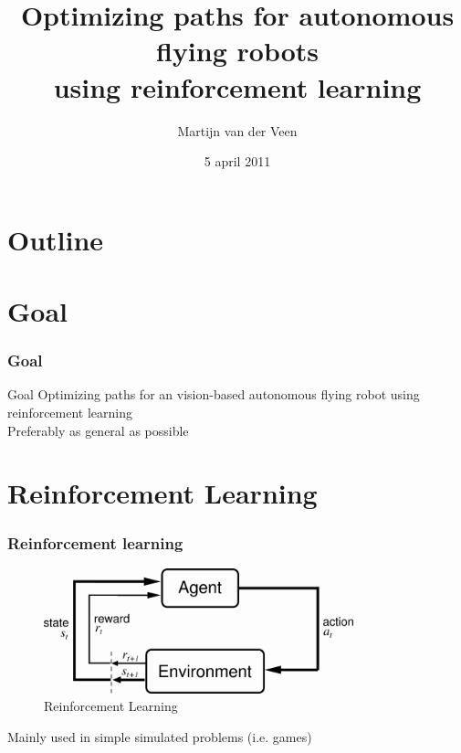 \documentclass{beamer}
\title{Optimizing paths for autonomous flying robots \\ using reinforcement learning}
\author[Martijn van der Veen]{Martijn van der Veen}
\date[05-04-2011]{5 april 2011}
\begin{document}
\begin{frame}
  \titlepage
\end{frame}

\section*{Outline}

\begin{frame}
  \tableofcontents
\end{frame}


\section{Goal}

\begin{frame}
  \frametitle{Goal}
  \begin{block}{Goal}
    Optimizing paths for an vision-based autonomous flying robot using reinforcement learning \\

    Preferably as general as possible
  \end{block}
\end{frame}

\section{Reinforcement Learning}
\begin{frame}
  \frametitle{Reinforcement learning}
  \begin{figure}
    \includegraphics[width=0.8\textwidth]{img/RL}
    \caption{Reinforcement Learning}
  \end{figure}
  Mainly used in simple simulated problems (i.e. games)
\end{frame}


\end{document}
